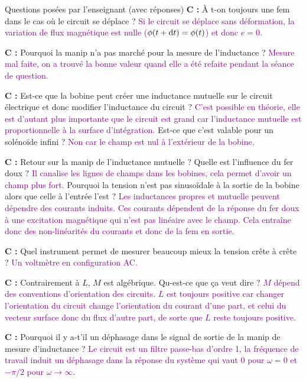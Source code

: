 \begin{reportBlock}{Questions posées par l’enseignant (avec réponses)}
  \textbf{C :} \`{A} t-on toujours une fem dans le cas où le circuit se déplace ? \textcolor{purple}{Si le circuit se déplace sans déformation, la variation de flux magnétique est nulle ($\phi(t+\mathrm{d} t) = \phi(t)$) et donc $e=0$.}\newline
  
  \textbf{C :} Pourquoi la manip n'a pas marché pour la mesure de l'inductance ? \textcolor{purple}{Mesure mal faite, on a trouvé la bonne valeur quand elle a été refaite pendant la séance de question.}  \newline
  
  \textbf{C :} Est-ce que la bobine peut créer une inductance mutuelle sur le circuit électrique et donc modifier l'inductance du circuit ? \textcolor{purple}{C'est possible en théorie, elle est d'autant plus importante que le circuit est grand car l'inductance mutuelle est proportionnelle à la surface d'intégration.} Est-ce que c'est valable pour un solénoïde infini ? \textcolor{purple}{Non car le champ est nul à l'extérieur de la bobine.}\newline
  
  \textbf{C :} Retour sur la manip de l'inductance mutuelle ? Quelle est l'influence du fer doux ? \textcolor{purple}{Il canalise les lignes de champs dans les bobines, cela permet d'avoir un champ plus fort.} Pourquoi la tension n'est pas sinusoïdale à la sortie de la bobine alors que celle à l'entrée l'est ? \textcolor{purple}{Les inductances propres et mutuelle peuvent dépendre des courants induits. Ces courants dépendent de la réponse du fer doux à une excitation magnétique qui n'est pas linéaire avec le champ. Cela entraîne donc des non-linéarités du courants et donc de la fem en sortie.}\newline
  
  \textbf{C :} Quel instrument permet de mesurer beaucoup mieux la tension crête à crête ? \textcolor{purple}{Un voltmètre en configuration AC.}\newline
  
  \textbf{C :} Contrairement à $L$, $M$ est algébrique. Qu-est-ce que ça veut dire ? \textcolor{purple}{$M$ dépend des conventions d'orientation des circuits. $L$ est toujours positive car changer l'orientation du circuit change l'orientation du courant d'une part, et celui du vecteur surface donc du flux d'autre part, de sorte que $L$ reste toujours positive.}\newline
  
  \textbf{C :} Pourquoi il y a-t'il un déphasage dans le signal de sortie de la manip de mesure d'inductance ? \textcolor{purple}{Le circuit est un filtre passe-bas d'ordre 1, la fréquence de travail induit un déphasage dans la réponse du système qui vaut $0$ pour $\omega=0$ et $-\pi/2$ pour $\omega\rightarrow\infty$}.
  
  
\end{reportBlock}





